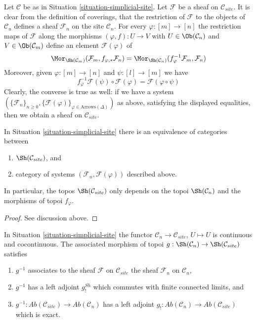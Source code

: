 \noindent
Let $\mathcal{C}$ be as in Situation \ref{situation-simplicial-site}.
Let $\mathcal{F}$ be a sheaf on $\mathcal{C}_{site}$.
It is clear from the definition of coverings, that the restriction
of $\mathcal{F}$ to the objects of $\mathcal{C}_n$ defines a sheaf
$\mathcal{F}_n$ on the site $\mathcal{C}_n$. For every
$\varphi : [m] \to [n]$ the restriction maps of $\mathcal{F}$
along the morphisms $(\varphi, f) : U \to V$ with 
$U \in \Ob(\mathcal{C}_n)$ and $V \in \Ob(\mathcal{C}_m)$
define an element $\mathcal{F}(\varphi)$ of
$$
\Mor_{\Sh(\mathcal{C}_m)}(\mathcal{F}_m, f_{\varphi, *}\mathcal{F}_n) =
\Mor_{\Sh(\mathcal{C}_n)}(f_\varphi^{-1}\mathcal{F}_m, \mathcal{F}_n)
$$
Moreover, given $\varphi : [m] \to [n]$ and $\psi : [l] \to [m]$
we have
$$
f_\varphi^{-1}\mathcal{F}(\psi) \circ \mathcal{F}(\varphi) =
\mathcal{F}(\varphi \circ \psi)
$$
Clearly, the converse is true as well: if we have a system
$(\{\mathcal{F}_n\}_{n \geq 0},
\{\mathcal{F}(\varphi)\}_{\varphi \in \text{Arrows}(\Delta)})$
as above, satisfying the displayed equalities,
then we obtain a sheaf on $\mathcal{C}_{site}$.

\begin{lemma}
\label{lemma-describe-sheaves-simplicial-site-site}
In Situation \ref{situation-simplicial-site} there is an equivalence of
categories between
\begin{enumerate}
\item $\Sh(\mathcal{C}_{site})$, and
\item category of systems $(\mathcal{F}_n, \mathcal{F}(\varphi))$
described above.
\end{enumerate}
In particular, the topos $\Sh(\mathcal{C}_{site})$ only depends on
the topoi $\Sh(\mathcal{C}_n)$ and the morphisms of topoi $f_\varphi$.
\end{lemma}

\begin{proof}
See discussion above.
\end{proof}

\begin{lemma}
\label{lemma-restriction-to-components-site}
In Situation \ref{situation-simplicial-site} the functor
$\mathcal{C}_n \to \mathcal{C}_{site}$, $U \mapsto U$ is continuous
and cocontinuous. The associated morphism of
topoi $g : \Sh(\mathcal{C}_n) \to \Sh(\mathcal{C}_{site})$ satisfies
\begin{enumerate}
\item $g^{-1}$ associates to the sheaf $\mathcal{F}$ on $\mathcal{C}_{site}$
the sheaf $\mathcal{F}_n$ on $\mathcal{C}_n$,
\item $g^{-1}$ has a left adjoint $g^{Sh}_!$ which commutes
with finite connected limits, and
\item $g^{-1} : \textit{Ab}(\mathcal{C}_{site}) \to \textit{Ab}(\mathcal{C}_n)$
has a left adjoint
$g_! : \textit{Ab}(\mathcal{C}_n) \to \textit{Ab}(\mathcal{C}_{site})$
which is exact.
\end{enumerate}
\end{lemma}

